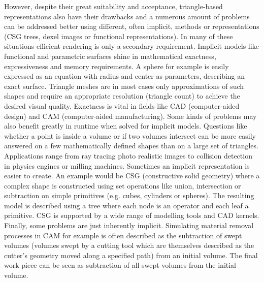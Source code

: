 However, despite their great suitability and acceptance, triangle-based representations also have their drawbacks and a numerous amount of problems can be addressed better using different, often implicit, methods or representations (\eg CSG trees, dexel images or functional representations).
In many of these situations efficient rendering is only a secondary requirement.
Implicit models like functional and parametric surfaces shine in mathematical exactness, expressiveness and memory requirements.
A sphere for example is easily expressed as an equation with radius and center as parameters, describing an exact surface.
Triangle meshes are in most cases only approximations of such shapes and require an appropriate resolution (\ie triangle count) to achieve the desired visual quality.
Exactness is vital in fields like CAD (computer-aided design) and CAM (computer-aided manufacturing).
%
Some kinds of problems may also benefit greatly in runtime when solved for implicit models.
Questions like whether a point is inside a volume or if two volumes intersect can be more easily answered on a few mathematically defined shapes than on a large set of triangles.
Applications range from ray tracing photo realistic images to collision detection in physics engines or milling machines.
%
Sometimes an implicit representation is easier to create.
An example would be CSG (constructive solid geometry) where a complex shape is constructed using set operations like union, intersection or subtraction on simple primitives (e.g. cubes, cylinders or spheres).
The resulting model is described using a tree where each node is an operator and each leaf a primitive.
CSG is supported by a wide range of modelling tools and CAD kernels.
%
Finally, some problems are just inherently implicit.
Simulating material removal processes in CAM for example is often described as the subtraction of swept volumes (volumes swept by a cutting tool which are themselves described as the cutter's geometry moved along a specified path) from an initial volume.
The final work piece can be seen as subtraction of all swept volumes from the initial volume.


